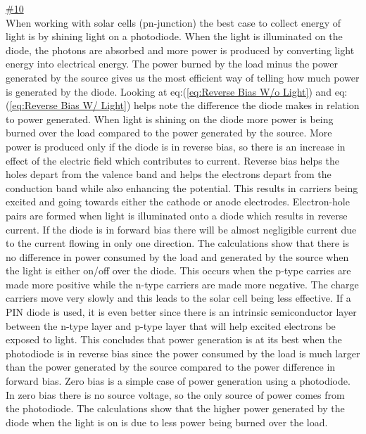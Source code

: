 \underline{\#10}
\\
When working with solar cells (pn-junction) the best case to collect energy of light is by shining light on a photodiode. When the light is illuminated on the diode, the photons are absorbed and more power is produced by converting light energy into electrical energy. The power burned by the load minus the power generated by the source gives us the most efficient way of telling how much power is generated by the diode. Looking at eq:(\ref{eq:Reverse Bias W/o Light}) and eq:(\ref{eq:Reverse Bias W/ Light}) helps note the difference the diode makes in relation to power generated. When light is shining on the diode more power is being burned over the load compared to the power generated by the source. More power is produced only if the diode is in reverse bias, so there is an increase in effect of the electric field which contributes to current. Reverse bias helps the holes depart from the valence band and helps the electrons depart from the conduction band while also enhancing the potential. This results in carriers being excited and going towards either the cathode or anode electrodes. Electron-hole pairs are formed when light is illuminated onto a diode which results in reverse current. If the diode is in forward bias there will be almost negligible current due to the current flowing in only one direction. The calculations show that there is no difference in power consumed by the load and generated by the source when the light is either on/off over the diode. This occurs when the p-type carries are made more positive while the n-type carriers are made more negative. The charge carriers move very slowly and this leads to the solar cell being less effective. If a PIN diode is used, it is even better since there is an intrinsic semiconductor layer between the n-type layer and p-type layer that will help excited electrons be exposed to light. This concludes that power generation is at its best when the photodiode is in reverse bias since the power consumed by the load is much larger than the power generated by the source compared to the power difference in forward bias. Zero bias is a simple case of power generation using a photodiode. In zero bias there is no source voltage, so the only source of power comes from the photodiode. The calculations show that the higher power generated by the diode when the light is on is due to less power being burned over the load.\\



